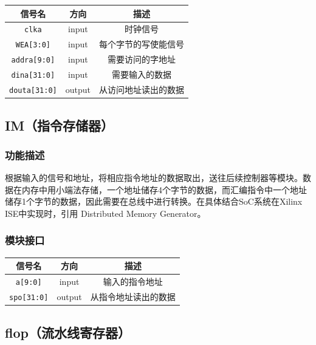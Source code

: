 \documentclass[UTF8,a4paper,autofakebold,15pt]{ctexart}
\begin{document}
\begin{center}
	
	\begin{tabular}{|c|c|c|}
		\hline
		信号名&方向&描述\\
		\hline
		{\tt clka}&input&时钟信号\\
		\hline
		{\tt WEA[3:0]}&input&每个字节的写使能信号\\
		\hline
		{\tt addra[9:0]}&input&需要访问的字地址\\
		\hline
		{\tt dina[31:0]}&input&需要输入的数据\\
		\hline
		{\tt douta[31:0]}&output&从访问地址读出的数据\\
		\hline
	\end{tabular}
	
\end{center}

\subsection{IM（指令存储器）}

\subsubsection{功能描述}

根据输入的信号和地址，将相应指令地址的数据取出，送往后续控制器等模块。数据在内存中用小端法存储，一个地址储存4个字节的数据，而汇编指令中一个地址储存1个字节的数据，因此需要在总线中进行转换。在具体结合SoC系统在Xilinx ISE中实现时，引用 Distributed Memory Generator。

\subsubsection{模块接口}

\begin{center}
	
	
	\begin{tabular}{|c|c|c|}
		\hline
		信号名&方向&描述\\
		\hline
		{\tt a[9:0]}&input&输入的指令地址\\
		\hline
		{\tt spo[31:0]}&output&从指令地址读出的数据\\
		\hline
	\end{tabular}
\end{center}

\subsection{flop（流水线寄存器）}
\end{document}
